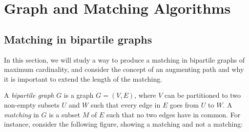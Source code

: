 \documentclass[a4paper, openany]{memoir}
\begin{document}
    \chapter{Graph and Matching Algorithms}
    \section{Matching in bipartile graphs}
    In this section, we will study a way to produce a matching in bipartile graphs of maximum cardinality, and consider the concept of an augmenting path and why it is important to extend the length of the matching.

    A \emph{bipartile graph} $G$ is a graph $G = (V, E)$, where $V$ can be partitioned to two non-empty subsets $U$ and $W$ such that every edge in $E$ goes from $U$ to $W$. A \emph{matching} in $G$ is a subset $M$ of $E$ such that no two edges have in common. For instance, consider the following figure, showing a matching and not a matching:
\end{document}
